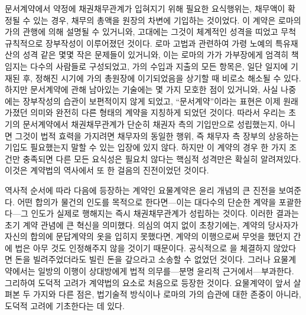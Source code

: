 문서계약에서 약정에 채권채무관계가 입혀지기 위해 필요한
요식행위는,
채무액이 확정될 수 있는 경우,
채무의 총액을
원장의 차변에 기입하는 것이었다.
이 계약은 로마의 가의 관행에 의해 설명될 수 있거니와,
고대에는 그것이 체계적인 성격을 띠었고 무척 규칙적으로 장부작성이
이루어졌던 것이다.
로마 고법과 관련하여
가령 노예의 특유재산의 성격 같은
몇몇 작은 문제들이 있거니와,
이는
로마의 가가 가부장에게 엄격히 책임지는 다수의 사람들로
구성되었고,
가의 수입과 지출의 모든 항목은,
일단 일지에 기재된 후,
정해진 시기에
가의 총원장에 이기되었음을 상기할 때
비로소 해소될 수 있다.
하지만 문서계약에 관해 남아있는 기술에는
몇 가지 모호한 점이 있거니와,
사실
나중에는
장부작성의 습관이
보편적이지 않게 되었고,
``문서계약''이라는 표현은 이제 원래 가졌던 의미와 완전히
다른 형태의 계약을 지칭하게 되었던 것이다.
따라서 우리는
초기의 문서계약에서
채권채무관계가 단순히 채권자 측의 기입만으로 성립했는지,
아니면
그것이 법적 효력을 가지려면
채무자의 동일한 행위, 즉 채무자 측 장부의 상응하는 기입도 필요했는지
말할 수 있는 입장에 있지 않다.
하지만
이 계약의 경우
한 가지 조건만 충족되면 다른 모든 요식성은 필요치 않다는
핵심적 성격만은 확실히 알려져있다.
이것은 계약법의 역사에서 또 한 걸음의 진전이었던 것이다.

역사적 순서에 따라 다음에 등장하는 계약인 요물계약은
윤리 개념의 큰 진전을 보여준다.
어떤 합의가 물건의 인도를 목적으로 한다면---이는
대다수의 단순한 계약을 포괄한다---그 인도가 실제로 행해지는 즉시
채권채무관계가 성립하는 것이다.
이러한 결과는 초기 계약 관념에 큰 혁신을 의미했다.
의심의 여지 없이 초창기에는,
계약의 당사자가 자신의 합의에 문답계약의 옷을 입히지 못했다면,
계약의 이행으로써 무엇을 했던지 간에
법은 아무 것도 인정해주지 않을 것이기 때문이다.
공식적으로 을 체결하지 않았다면
돈을 빌려주었더라도 빌린 돈을 갚으라고 소송할 수 없었던 것이다.
그러나 요물계약에서는
일방의 이행이 상대방에게 법적 의무를---분명 윤리적 근거에서---부과한다.
그리하여 도덕적 고려가 계약법의 요소로 처음으로 등장한 것이다.
요물계약이
앞서 살펴본 두 가지와 다른 점은,
법기술적 방식이나 로마의 가의 습관에 대한 존중이 아니라,
도덕적 고려에 기초한다는 데 있다.

